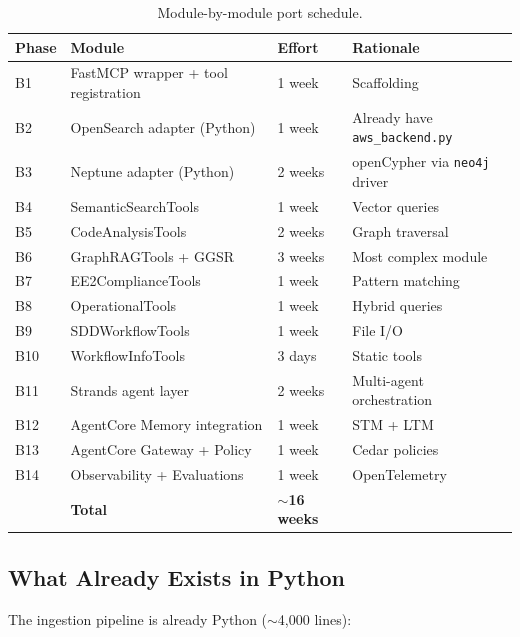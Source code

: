 \documentclass[11pt,letterpaper]{article}
\begin{document}
\begin{table}[H]
\centering
\footnotesize
\begin{tabular}{@{}llll@{}}
\toprule
\textbf{Phase} & \textbf{Module} & \textbf{Effort} & \textbf{Rationale} \\
\midrule
B1 & FastMCP wrapper + tool registration & 1 week & Scaffolding \\
B2 & OpenSearch adapter (Python) & 1 week & Already have \texttt{aws\_backend.py} \\
B3 & Neptune adapter (Python) & 2 weeks & openCypher via \texttt{neo4j} driver \\
B4 & SemanticSearchTools & 1 week & Vector queries \\
B5 & CodeAnalysisTools & 2 weeks & Graph traversal \\
B6 & GraphRAGTools + GGSR & 3 weeks & Most complex module \\
B7 & EE2ComplianceTools & 1 week & Pattern matching \\
B8 & OperationalTools & 1 week & Hybrid queries \\
B9 & SDDWorkflowTools & 1 week & File I/O \\
B10 & WorkflowInfoTools & 3 days & Static tools \\
B11 & Strands agent layer & 2 weeks & Multi-agent orchestration \\
B12 & AgentCore Memory integration & 1 week & STM + LTM \\
B13 & AgentCore Gateway + Policy & 1 week & Cedar policies \\
B14 & Observability + Evaluations & 1 week & OpenTelemetry \\
\midrule
& \textbf{Total} & \textbf{$\sim$16 weeks} & \\
\bottomrule
\end{tabular}
\caption{Module-by-module port schedule.}
\end{table}

\subsection{What Already Exists in Python}

The ingestion pipeline is already Python ($\sim$4,000 lines):
\end{document}
